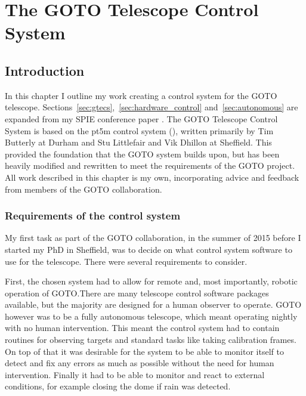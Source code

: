\chapter{The GOTO Telescope Control System}
\label{chap:gtecs}
\chaptoc{}


\newpage
\section{Introduction}
\label{sec:gtecs_intro}
\begin{colsection}


\begin{colsection}

In this chapter I outline my work creating a control system for the GOTO telescope. Sections~\ref{sec:gtecs},~\ref{sec:hardware_control} and~\ref{sec:autonomous} are expanded from my SPIE conference paper \citealt{Dyer}. The GOTO Telescope Control System is based on the pt5m control system (\citealt{pt5m}), written primarily by Tim Butterly at Durham and Stu Littlefair and Vik Dhillon at Sheffield. This provided the foundation that the GOTO system builds upon, but has been heavily modified and rewritten to meet the requirements of the GOTO project. All work described in this chapter is my own, incorporating advice and feedback from members of the GOTO collaboration.

\end{colsection}


\subsection{Requirements of the control system}
\label{sec:control_requirements}
\begin{colsection}

My first task as part of the GOTO collaboration, in the summer of 2015 before I started my PhD in Sheffield, was to decide on what control system software to use for the telescope. There were several requirements to consider.

First, the chosen system had to allow for remote and, most importantly, robotic operation of GOTO.\@ There are many telescope control software packages available, but the majority are designed for a human observer to operate. GOTO however was to be a fully autonomous telescope, which meant operating nightly with no human intervention. This meant the control system had to contain routines for observing targets and standard tasks like taking calibration frames. On top of that it was desirable for the system to be able to monitor itself to detect and fix any errors as much as possible without the need for human intervention. Finally it had to be able to monitor and react to external conditions, for example closing the dome if rain was detected.


\end{colsection}
\end{colsection}
